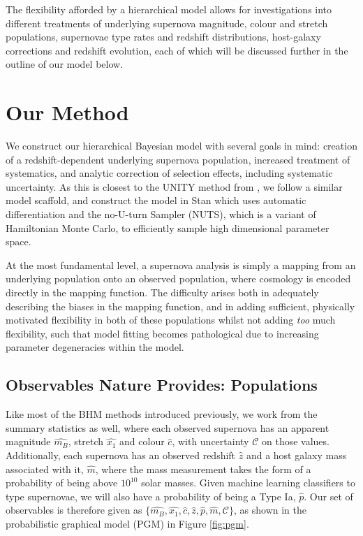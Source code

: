 \documentclass[a4paper,fleqn,usenatbib]{mnras}
\newcommand{\cov}{\mathcal{C}}
\newcommand{\rubin}{\citetalias{Rubin2015}}
\begin{document}
The flexibility afforded by a hierarchical model allows for investigations into different treatments of underlying supernova magnitude, colour and stretch populations, supernovae type rates and redshift distributions, host-galaxy corrections and redshift evolution, each of which will be discussed further in the outline of our model below.









\section{Our Method}
\label{sec:method}

We construct our hierarchical Bayesian model with several goals in mind: creation of a redshift-dependent underlying supernova population, increased treatment of systematics, and analytic correction of selection effects, including systematic uncertainty. As this is closest to the UNITY method from \citet[][hereafter denoted \rubin]{Rubin2015}, we follow a similar model scaffold, and construct the model in Stan \citep{Carpenter2017, StanDevelopmentTeam2017} which uses automatic differentiation and the no-U-turn Sampler (NUTS), which is a variant of Hamiltonian Monte Carlo, to efficiently sample high dimensional parameter space.

At the most fundamental level, a supernova analysis is simply a mapping from an underlying population onto an observed population, where cosmology is encoded directly in the mapping function. The difficulty arises both in adequately describing the biases in the mapping function, and in adding sufficient, physically motivated flexibility in both of these populations whilst not adding \textit{too} much flexibility, such that model fitting becomes pathological due to increasing parameter degeneracies within the model.


\subsection{Observables Nature Provides: Populations}

Like most of the BHM methods introduced previously, we work from the summary statistics as well, where each observed supernova has an apparent magnitude $\hat{m_B}$, stretch $\hat{x_1}$ and colour $\hat{c}$, with uncertainty $\cov$ on those values. Additionally, each supernova has an observed redshift $\hat{z}$ and a host galaxy mass associated with it, $\hat{m}$, where the mass measurement takes the form of a probability of being above $10^{10}$ solar masses. Given machine learning classifiers to type supernovae, we will also have a probability of being a Type Ia, $\hat{p}$. Our set of observables is therefore given as $\lbrace \hat{m_B}, \hat{x_1}, \hat{c}, \hat{z}, \hat{p}, \hat{m}, \cov \rbrace$, as shown in the probabilistic graphical model (PGM) in Figure \ref{fig:pgm}.
\end{document}
